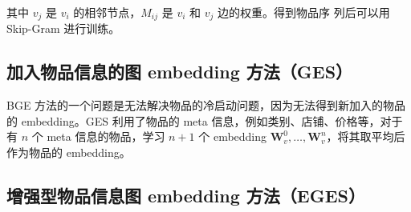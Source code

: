 其中 $v_j$ 是 $v_i$ 的相邻节点，$M_{ij}$ 是 $v_i$ 和 $v_j$ 边的权重。得到物品序
列后可以用 Skip-Gram 进行训练。

\subsection{加入物品信息的图 embedding 方法（GES）}
BGE 方法的一个问题是无法解决物品的冷启动问题，因为无法得到新加入的物品的
embedding。GES 利用了物品的 meta 信息，例如类别、店铺、价格等，对于有 $n$ 个
meta 信息的物品，学习 $n+1$ 个 embedding $\mathbf{W}_v^0, \ldots,
\mathbf{W}_v^n$，将其取平均后作为物品的 embedding。

\subsection{增强型物品信息图 embedding 方法（EGES）}


